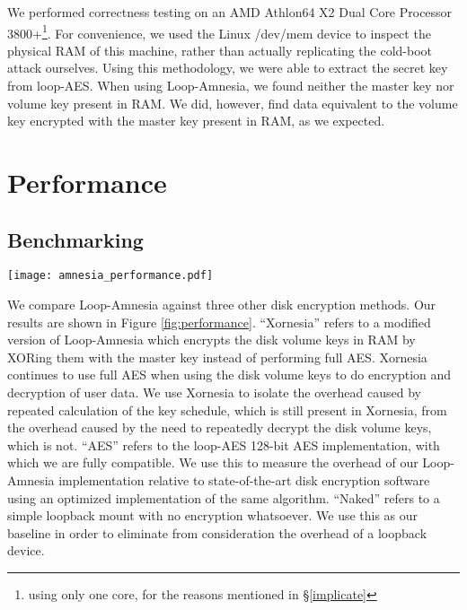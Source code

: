 \documentclass[letterpaper,twocolumn,nonatbib,10pt]{article}
\begin{document}
We performed correctness testing on an AMD Athlon64 X2 Dual Core
Processor 3800+\footnote{using only one core, for the reasons
  mentioned in \S\ref{implicate}}.  For convenience, we used the Linux
/dev/mem device to inspect the physical RAM of this machine, rather
than actually replicating the cold-boot attack ourselves.  Using this
methodology, we were able to extract the secret key from loop-AES.
When using Loop-Amnesia, we found neither the master key nor volume
key present in RAM.  We did, however, find data equivalent to the
volume key encrypted with the master key present in RAM, as we
expected.

\section{Performance}

\subsection{Benchmarking}

\begin{figure*}[t]
\texttt{[image: amnesia\_performance.pdf]}
\caption{Loop-Amnesia Performance} 
\label{fig:performance}
\end{figure*}

We compare Loop-Amnesia against three other disk encryption methods.
Our results are shown in Figure \ref{fig:performance}.  ``Xornesia''
refers to a modified version of Loop-Amnesia which encrypts the disk
volume keys in RAM by XORing them with the master key instead of
performing full AES.  Xornesia continues to use full AES when using
the disk volume keys to do encryption and decryption of user data.  We
use Xornesia to isolate the overhead caused by repeated calculation of
the key schedule, which is still present in Xornesia, from the
overhead caused by the need to repeatedly decrypt the disk volume
keys, which is not.  ``AES'' refers to the loop-AES 128-bit AES
implementation, with which we are fully compatible.  We use this to
measure the overhead of our Loop-Amnesia implementation relative to
state-of-the-art disk encryption software using an optimized
implementation of the same algorithm.  ``Naked'' refers to a simple
loopback mount with no encryption whatsoever.  We use this as our
baseline in order to eliminate from consideration the overhead of a
loopback device.
\end{document}
